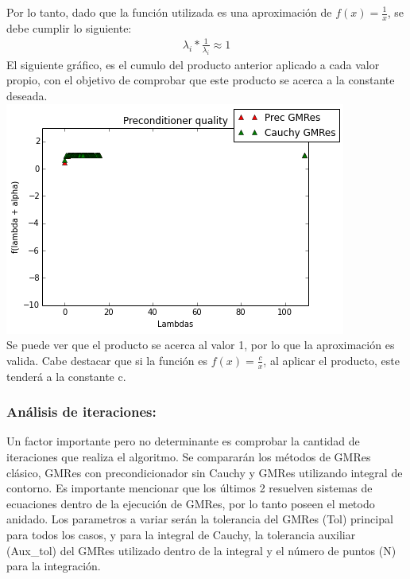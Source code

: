 \documentclass[fleqn]{article}
\begin{document}
Por lo tanto, dado que la función utilizada es una aproximación de $f(x) = \frac{1}{x}$, se debe cumplir lo siguiente:
\begin{align}
    \lambda_i*\frac{1}{\lambda_i} \approx 1
\end{align}
\newpage
El siguiente gráfico, es el cumulo del producto anterior aplicado a cada valor propio, con el objetivo de comprobar que este producto se acerca a la constante deseada.\\
\includegraphics[scale=0.5]{images/producto.png}\\
Se puede ver que el producto se acerca al valor 1, por lo que la aproximación es valida. Cabe destacar que si la función es $f(x) = \frac{c}{x}$, al aplicar el producto, este tenderá a la constante c.

\subsubsection*{Análisis de iteraciones:}
Un factor importante pero no determinante es comprobar la cantidad de iteraciones que realiza el algoritmo. Se compararán los métodos de GMRes clásico, GMRes con precondicionador sin Cauchy y GMRes utilizando integral de contorno. Es importante mencionar que los últimos 2 resuelven sistemas de ecuaciones dentro de la ejecución de GMRes, por lo tanto poseen el metodo anidado.
Los parametros a variar serán la tolerancia del GMRes (Tol) principal para todos los casos, y para la integral de Cauchy, la tolerancia auxiliar (Aux\_tol) del GMRes utilizado dentro de la integral y el número de puntos (N) para la integración.
\end{document}
